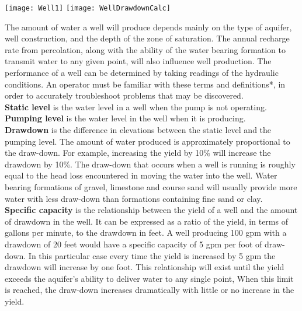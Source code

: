 \begin{center}
\texttt{[image: Well1]} \hspace{1cm} \texttt{[image: WellDrawdownCalc]}
\end{center}

The amount of water a well will produce depends mainly on the type of aquifer, well construction, and the depth of the zone of saturation. The annual recharge rate from percolation, along with the ability of the water bearing formation to transmit water to any given point, will also influence well production. The performance of a well can be determined by taking readings of the hydraulic conditions. An operator must be familiar with these terms and definitions*, in order to accurately troubleshoot problems that may be discovered.\\
\vspace{0.3cm}
\textbf{Static level }is the water level in a well when the pump is not operating.\\
\vspace{0.3cm}
\textbf{Pumping level} is the water level in the well when it is producing.\\
\vspace{0.3cm}
\textbf{Drawdown} is the difference in elevations between the static level and the pumping level. The amount of water produced is approximately proportional to the draw-down. For example, increasing the yield by 10\% will increase the drawdown by 10\%. The draw-down that occurs when a well is running is roughly equal to the head loss encountered in moving the water into the well. Water bearing formations of gravel, limestone and course sand will usually provide more water with less draw-down than formations containing fine sand or clay.\\
\vspace{0.3cm}
\textbf{Specific capacity} is the relationship between the yield of a well and the amount of drawdown in the well. It can be expressed as a ratio of the yield, in terms of gallons per minute, to the drawdown in feet. A well producing 100 gpm with a drawdown of 20 feet would have a specific capacity of 5 gpm per foot of draw-down. In this particular case every time the yield is increased by 5 gpm the drawdown will increase by one foot. This relationship will exist until the yield exceeds the aquifer’s ability to deliver water to any single point, When this limit is reached, the draw-down increases dramatically with little or no increase in the yield.\\
